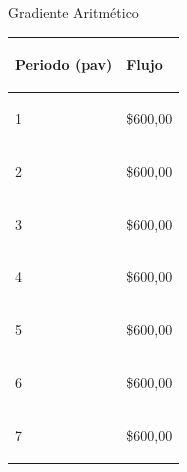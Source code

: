 \item Gradiente Aritmético
\begin{spacing}{0.1}
\begin{center}
\begin{tabular}{ |p{3.5cm}| p{3cm}|}
\hline 
\begin{center}\textbf{Periodo (pav) } \end{center}  & \begin{center} \textbf{Flujo} \end{center}  \\ \hline

\begin{center}1 \end{center}    &  \begin{center} \$600,00\end{center} \\ \hline

\begin{center}2 \end{center}    &  \begin{center} \$600,00\end{center} \\ \hline 

\begin{center}3 \end{center}    & \begin{center} \$600,00 \end{center}  \\ \hline

\begin{center}4 \end{center}    & \begin{center} \$600,00\end{center}  \\ \hline

\begin{center}5 \end{center}    & \begin{center} \$600,00 \end{center}  \\ \hline

\begin{center}6 \end{center}    & \begin{center} \$600,00 \end{center}  \\ \hline

\begin{center}7 \end{center}    & \begin{center} \$600,00\end{center}  \\ \hline


\end{tabular}
\end{center}
\end{spacing}
